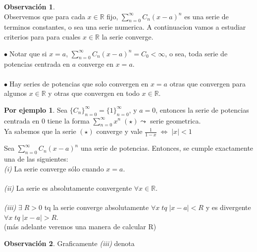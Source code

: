 \documentclass{article}
\theoremstyle{definition}
\newtheorem*{obs}{Observación}
\newtheorem*{ej}{Por ejemplo}
\theoremstyle{remark}
\newcommand\bl{$\bullet\;$}
\begin{document}
\begin{obs} \; \\
  Observemos que para cada $x \in \mathbb{R}$ fijo, $\sum_{n=0}^{\infty}{C_n(x-a)^n}$ es una serie de terminos constantes, o sea una serie numerica. A continuacion vamos a estudiar criterios para para cuales $x \in \mathbb{R}$ la serie converge.  
\end{obs}
\bl Notar que si $x=a$, $\sum_{n=0}^{\infty}{C_n(x-a)^n}=C_0 < \infty$, o sea, toda serie de potencias centrada en $a$ converge en $x=a$.
 \\  \\
 \bl Hay series de potencias que solo convergen en $x=a$ otras que convergen para algunos $x \in \mathbb{R}$ y otras que convergen en todo $x \in \mathbb{R}$.
\begin{ej}
  Sea $\{C_n\}_{n=0}^{\infty} = \{1\}_{n=0}^{\infty}$, y $a=0$, entonces la serie de potencias centrada en $0$ tiene la forma $\sum_{n=0}^{\infty}{x^n \; (\star)\leadsto}$ serie geometrica. \\ 
  Ya sabemos que la serie $(\star)$ converge y vale $\frac{1}{1-x} \; \Longleftrightarrow \; |x| < 1 $
    
\end{ej}
\begin{figure}[h]
\centering
\def\svgwidth{0.75\textwidth}

\end{figure}
\pagebreak
\begin{teo}
  Sea $\sum_{n=0}^{\infty}{C_n(x-a)^n}$ una serie de potencias. Entonces, se cumple exactamente una de las siguientes: \\ 
   
  \emph{(i)\phantom{ii}} La serie converge sólo cuando $x=a$. \\\\ 
  \emph{(ii)\phantom{i}}  La serie es absolutamente convergente $\forall x \in \mathbb{R}$.   \\ \\  
  \emph{(iii)} $\exists \; R > 0$ tq la serie converge absolutamente $\forall x \; tq \; |x-a| < R$ y es divergente $\forall x \; tq \; |x-a| > R$. \\ (más adelante veremos una manera de calcular R) 

\end{teo}
\begin{obs}
Graficamente \emph{(iii)} denota 
\end{obs}

\begin{figure}[h]
\centering
\def\svgwidth{0.75\textwidth}

\end{figure}
\end{document}
